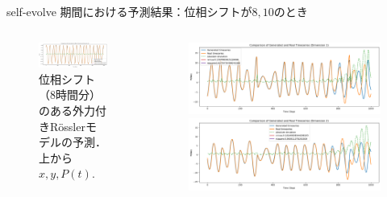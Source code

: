 \begin{frame}{self-evolve 期間における予測結果：位相シフトが$8, 10$のとき}
\begin{columns}[T]
\begin{column}{.5\textwidth}
\begin{figure}
        \vspace{.5em}
        \begin{minipage}[c][.27\textheight][c]{\linewidth}
          \centering
          \includegraphics[width=0.7\linewidth]{Fig/8.p.png}
          \caption{\scriptsize{位相シフト（8時間分）のある外力付きRösslerモデルの予測．上から $x, y, P(t)$. }}
        \end{minipage}
      \end{figure}
    \end{column}
    \begin{column}{.5\textwidth}
      \begin{figure}
        \vspace{-.5cm}
        \begin{minipage}[c][.27\textheight][c]{\linewidth}
          \centering
          \includegraphics[width=0.7\linewidth]{Fig/10.x.png}
        \end{minipage}
    
        \vspace{-.5em}

        \begin{minipage}[c][.27\textheight][c]{\linewidth}
          \centering
          \includegraphics[width=0.7\linewidth]{Fig/10.y.png}
        \end{minipage}
        

\end{figure}
\end{column}
\end{columns}
\end{frame}
